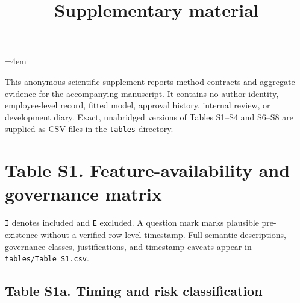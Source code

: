 \documentclass[
  a4paper,
  review]{elsarticle}
\title{Supplementary material}
\author{}
\date{}
\begin{document}
\emergencystretch=4em
\setlength{\tabcolsep}{2.5pt}
\maketitle

This anonymous scientific supplement reports method contracts and
aggregate evidence for the accompanying manuscript. It contains no
author identity, employee-level record, fitted model, approval history,
internal review, or development diary. Exact, unabridged versions of
Tables S1--S4 and S6--S8 are supplied as CSV files in the
\texttt{tables} directory.

\section{Table S1. Feature-availability and governance
matrix}\label{table-s1.-feature-availability-and-governance-matrix}

\texttt{I} denotes included and \texttt{E} excluded. A question mark
marks plausible pre-existence without a verified row-level timestamp.
Full semantic descriptions, governance classes, justifications, and
timestamp caveats appear in \texttt{tables/Table\_S1.csv}.

\subsection{Table S1a. Timing and risk
classification}\label{table-s1a.-timing-and-risk-classification}
\end{document}
